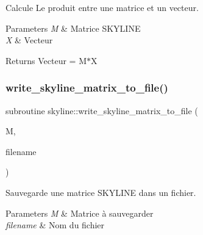 Calcule Le produit entre une matrice et un vecteur. 


\begin{DoxyParams}{Parameters}
{\em M} & Matrice S\+K\+Y\+L\+I\+NE \\
\hline
{\em X} & Vecteur \\
\hline
\end{DoxyParams}
\begin{DoxyReturn}{Returns}
Vecteur = M$\ast$X 
\end{DoxyReturn}
\mbox{\label{namespaceskyline_a3377a8391ad2d61659689fc8c4130bdc}} 
\subsubsection{\texorpdfstring{write\+\_\+skyline\+\_\+matrix\+\_\+to\+\_\+file()}{write\_skyline\_matrix\_to\_file()}}
{\footnotesize\ttfamily subroutine skyline\+::write\+\_\+skyline\+\_\+matrix\+\_\+to\+\_\+file (\begin{DoxyParamCaption}\item[{type (\hyperlink{structskyline_1_1skyline__matrix}{skyline\+\_\+matrix})}]{M,  }\item[{character(len=$\ast$), intent(in)}]{filename }\end{DoxyParamCaption})}



Sauvegarde une matrice S\+K\+Y\+L\+I\+NE dans un fichier. 


\begin{DoxyParams}{Parameters}
{\em M} & Matrice à sauvegarder \\
\hline
{\em filename} & Nom du fichier \\
\hline
\end{DoxyParams}
